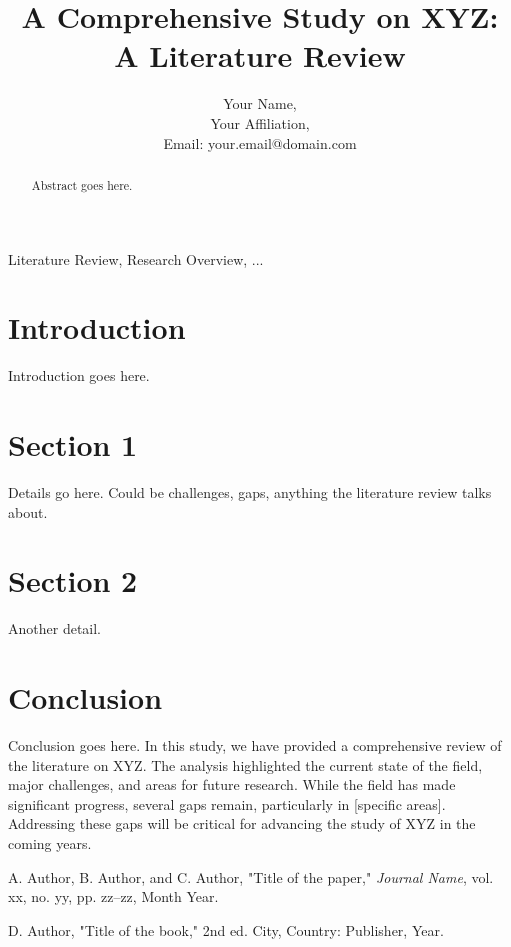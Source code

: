 \documentclass[journal,12pt,onecolumn,draftclsnofoot]{IEEEtran}
\title{A Comprehensive Study on XYZ: A Literature Review}
\author{Your Name,\\
        Your Affiliation,\\
        Email: your.email@domain.com}
\begin{document}
\maketitle

\begin{abstract}
Abstract goes here.
\end{abstract}

\begin{IEEEkeywords}
Literature Review, Research Overview, ...
\end{IEEEkeywords}

\section{Introduction}
Introduction goes here.

\section{Section 1}
Details go here. Could be challenges, gaps, anything the literature review talks about.

\section{Section 2}
Another detail.

\section{Conclusion}
Conclusion goes here.
In this study, we have provided a comprehensive review of the literature on XYZ. The analysis highlighted the current state of the field, major challenges, and areas for future research. While the field has made significant progress, several gaps remain, particularly in [specific areas]. Addressing these gaps will be critical for advancing the study of XYZ in the coming years.

\begin{thebibliography}{99}

A. Author, B. Author, and C. Author, "Title of the paper," \textit{Journal Name}, vol. xx, no. yy, pp. zz–zz, Month Year.

D. Author, "Title of the book," 2nd ed. City, Country: Publisher, Year.

\end{thebibliography}
\end{document}

